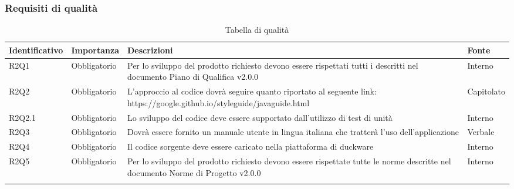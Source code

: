 \subsubsection{Requisiti di qualità}
\begin{center}
	\renewcommand{\arraystretch}{1.5}
	\begin{longtable}{  >{\RaggedRight}p{2.5cm}  
						>{\RaggedRight}p{2.1cm} 
						>{\RaggedRight}p{7cm}  
						>{\RaggedRight}p{1.7cm} 
						}
		\rowcolor{tableHeadYellow}

		\textbf{Identificativo}   & \textbf{Importanza} & \textbf{Descrizioni} & \textbf{Fonte} \\ 
		\endhead

		R2Q1   & Obbligatorio & Per lo sviluppo del prodotto richiesto devono essere rispettati tutti i \markg{processi} descritti nel documento Piano di Qualifica v2.0.0 & Interno    \\
		R2Q2   & Obbligatorio & L'approccio al codice \markg{Java} dovrà seguire quanto riportato al seguente link: https://google.github.io/styleguide/javaguide.html                & Capitolato \\
		R2Q2.1 & Obbligatorio & Lo sviluppo del codice deve essere supportato dall'utilizzo di test di unità                                                        & Interno    \\  
		R2Q3   & Obbligatorio & Dovrà essere fornito un manuale utente in lingua italiana che tratterà l'uso dell'applicazione                                      & Verbale    \\  
		R2Q4   & Obbligatorio & Il codice sorgente deve essere caricato nella piattaforma \markg{GitLab} di duckware                                                        & Interno    \\  
		R2Q5   & Obbligatorio & Per lo sviluppo del prodotto richiesto devono essere rispettate tutte le norme descritte nel documento Norme di Progetto v2.0.0 & Interno    \\  

		\rowcolor{white}
		\caption{Tabella \markg{requisiti} di qualità}
	\end{longtable}
\end{center}
\clearpage
